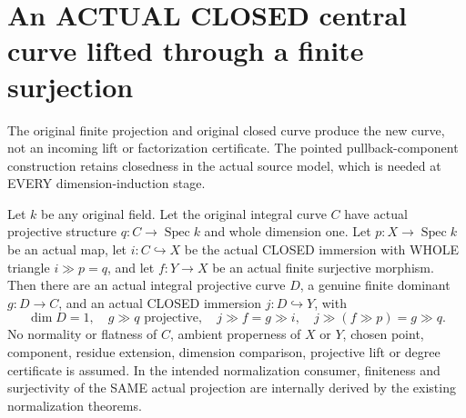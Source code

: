 \section{An ACTUAL CLOSED central curve lifted through a finite surjection}
The original finite projection and original closed curve produce the
new curve, not an incoming lift or factorization certificate. The
pointed pullback-component construction retains closedness in the
actual source model, which is needed at EVERY dimension-induction stage.

\begin{theorem}
\label{thm:pl-gauss-original-closed-projective-curve-finite-lift}
\leanok
Let $k$ be any original field. Let the original integral curve $C$
have actual projective structure $q:C\to\operatorname{Spec}k$ and
whole dimension one. Let $p:X\to\operatorname{Spec}k$ be an actual
map, let $i:C\hookrightarrow X$ be the actual CLOSED immersion with
WHOLE triangle $i\gg p=q$, and let $f:Y\to X$ be an actual finite
surjective morphism. Then there are an actual integral projective
curve $D$, a genuine finite dominant $g:D\to C$, and an actual
CLOSED immersion $j:D\hookrightarrow Y$, with
\[
 \dim D=1,\quad g\gg q\text{ projective},\quad
 j\gg f=g\gg i,\quad j\gg(f\gg p)=g\gg q.
\]
No normality or flatness of $C$, ambient properness of $X$ or $Y$,
chosen point, component, residue extension, dimension comparison,
projective lift or degree certificate is assumed. In the intended
normalization consumer, finiteness and surjectivity of the SAME actual
projection are internally derived by the existing normalization theorems.
\end{theorem}
